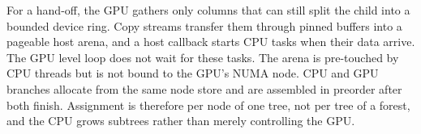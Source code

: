 For a hand-off, the GPU gathers only columns that can still split the child into a bounded device ring. Copy streams transfer them through pinned buffers into a pageable host arena, and a host callback starts CPU tasks when their data arrive. The GPU level loop does not wait for these tasks. The arena is pre-touched by CPU threads but is not bound to the GPU's NUMA node. CPU and GPU branches allocate from the same node store and are assembled in preorder after both finish. Assignment is therefore per node of one tree, not per tree of a forest, and the CPU grows subtrees rather than merely controlling the GPU.
